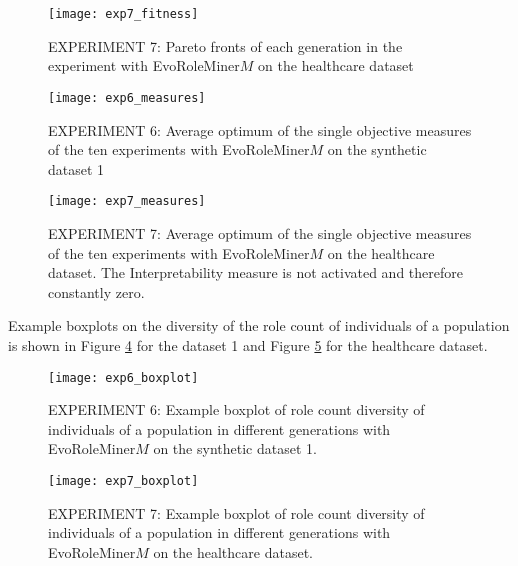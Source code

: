\begin{figure}[H]
	\centering
	\texttt{[image: exp7\_fitness]}
	\caption{EXPERIMENT 7: Pareto fronts of each generation in the experiment with EvoRoleMiner$M$ on the healthcare dataset}
	\label{fig:exp7_fitness}
\end{figure}

\begin{figure}[H]
	\centering
	\texttt{[image: exp6\_measures]}
	\caption{EXPERIMENT 6: Average optimum of the single objective measures of the ten experiments with EvoRoleMiner$M$ on the synthetic dataset 1}
	\label{fig:exp6_measures}
\end{figure}

\begin{figure}[H]
	\centering
	\texttt{[image: exp7\_measures]}
	\caption{EXPERIMENT 7: Average optimum of the single objective measures of the ten experiments with EvoRoleMiner$M$ on the healthcare dataset. The Interpretability measure is not activated and therefore constantly zero.}
	\label{fig:exp7_measures}
\end{figure}

Example boxplots on the diversity of the role count of individuals of a population is shown in Figure \ref{fig:exp6_boxplot} for the dataset 1 and Figure \ref{fig:exp7_boxplot} for the healthcare dataset.

\begin{figure}[H]
	\centering
	\texttt{[image: exp6\_boxplot]}
	\caption{EXPERIMENT 6: Example boxplot of role count diversity of individuals of a population in different generations with EvoRoleMiner$M$ on the synthetic dataset 1.}
	\label{fig:exp6_boxplot}
\end{figure}

\begin{figure}[H]
	\centering
	\texttt{[image: exp7\_boxplot]}
	\caption{EXPERIMENT 7: Example boxplot of role count diversity of individuals of a population in different generations with EvoRoleMiner$M$ on the healthcare dataset.}
	\label{fig:exp7_boxplot}
\end{figure}